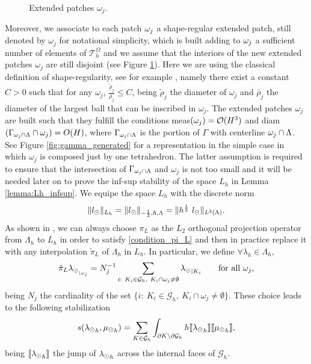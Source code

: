 \begin{figure}\label{fig:patch}
\center

\caption{Extended patches $\omega_j$.}
\end{figure}

Moreover, we associate to each patch $\omega _j$ a shape-regular extended patch, still denoted by $\omega_j$ for notational simplicity, which is built adding to $\omega _j$ a sufficient number of elements of $\mathcal{T}_h^{\Omega}$ and we assume that the interiors of the new extended patches $\omega _j$ are still disjoint (see Figure \ref{fig:patch}). Here we are using the classical definition of shape-regularity, see for example \cite{MR2050138}, namely there exist a constant $C>0$ such that for any $\omega_j$, $\frac{\tilde{\rho}_j}{\bar{\rho}_j}\leq C$, being $\tilde{\rho}_j$ the diameter of $\omega_j$ and $\bar{\rho}_j$ the diameter of the largest ball that can be inscribed in $\omega_j$. The extended patches $\omega _j$ are built such that they fulfill the conditions meas$(\omega _j)=\mathcal{O}(H^3)$ and {\color{red}diam$(\Gamma_{\omega _j\cap \Lambda}\cap \omega_j)=O(H)$}, where $\Gamma_{\omega _j\cap \Lambda}$ is the portion of $\Gamma$ with centerline $\omega _j\cap \Lambda$. See Figure \ref{fig:gamma_generated} for a representation in the simple case in which $\omega _j$ is composed just by one tetrahedron. The latter assumption is required to ensure that the intersection of $\Gamma_{\omega _j\cap \Lambda}$ and $\omega_j$ is not too small and it will be needed later on to prove the inf-sup stability of the space $L_h$ in Lemma \ref{lemma:Lh_infsup}. We equipe the space $L_h$ with the discrete norm 
\begin{equation*}
\|l_{\odot} \|_{L_h} = \|l_{\odot} \|_{-\frac 12, h, \Lambda} = \|h^{\frac 12} \  l_{\odot} \|_{L^2(\Lambda)}.
\end{equation*}
As shown in \cite[Section III]{burman2014}, we can always choose $\pi_L$ as the $L_2$ orthogonal projection operator from $\Lambda_h$ to $L_h$ in order to satisfy \eqref{condition_pi_L} and then in practice replace it with any interpolation $\tilde{\pi}_L$ of $\Lambda_h$ in $L_h$. In particular, we define $\forall \lambda_h \in \Lambda_h$,
\begin{equation*}
\tilde{\pi}_L {\lambda_{\odot}}_{ _{|\omega _j}} = N_j^{-1} \sum_{\substack{i: \ K_i \in \mathcal{G}_h, \  K_i \cap \omega_j \neq \emptyset}} {\lambda_{\odot}}_{|K_i} \qquad \text{for all $\omega_j$,} 
\end{equation*}
being $N_j$ the cardinality of the set $\{i: \ K_i \in \mathcal{G}_h, \  K_i \cap \omega_j \neq \emptyset\}$. These choice leads to the following stabilization 
\begin{equation*}
s({\lambda_{\odot}}_h, {\mu_{\odot}}_h)= \sum _{K\in \mathcal{G}_{h}} \int_{\partial K\setminus \partial \mathcal{G}_{h}} h \llbracket {\lambda_{\odot}}_h \rrbracket \llbracket {\mu_{\odot}}_h \rrbracket,
\end{equation*}
being $\llbracket {\lambda_{\odot}}_h \rrbracket$ the jump of ${\lambda_{\odot}}_h$ across the internal faces of $\mathcal{G}_h$.

